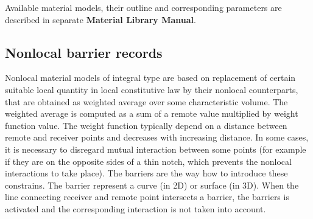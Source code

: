 \documentclass[a4paper]{article}
\begin{document}
Available material models, their outline and
corresponding parameters are described in separate {\bf Material Library Manual}.

\subsection{Nonlocal barrier records}
\label{_NonlocalBarrierRecords}
Nonlocal material models of integral type are based on replacement of
certain suitable local quantity in local constitutive law by their
nonlocal counterparts, that are obtained as weighted average over
some characteristic volume. The weighted average is computed as a sum
of a remote value multiplied by weight function value. The weight
function typically depend on a distance between remote and receiver
points and decreases with increasing distance. In some cases, it is
necessary to disregard mutual interaction between some points (for
example if they are on the opposite sides of a thin notch, which
prevents the nonlocal interactions to take place). The barriers are
the way how to introduce these constrains. The barrier represent a
curve (in 2D) or surface (in 3D). When the line connecting receiver and
remote point intersects a barrier, the barriers is activated and the
corresponding interaction is not taken into account.
\end{document}
